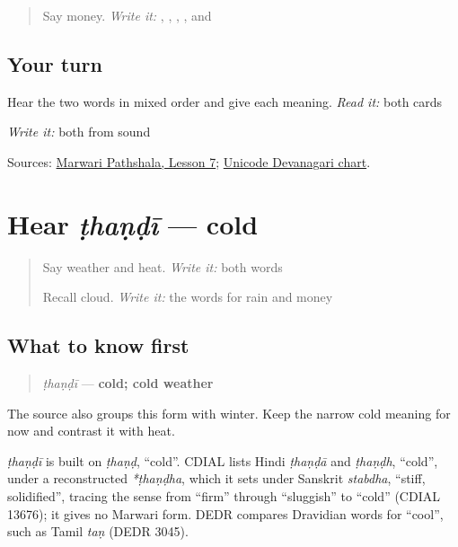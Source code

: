 \begin{quote}
Say money. \emph{Write it:} \textbf{}, \textbf{}, \textbf{}, \textbf{}, and \textbf{}
\end{quote}

\subsection*{Your turn}
Hear the two words in mixed order and give each meaning. \emph{Read it:} both cards

\emph{Write it:} both from sound

\begin{tcolorbox}[breakable,colback=teal!4,colframe=teal!35!black,title={Before you move on}]
Sources: \href{https://www.marwaripathshala.com/marwari-lesson-7-english}{Marwari Pathshala, Lesson 7}; \href{https://www.unicode.org/charts/PDF/U0900.pdf}{Unicode Devanagari chart}.
\end{tcolorbox}
\section[ṭhaṇḍī]{Hear \emph{ṭhaṇḍī} — cold}

\label{lesson:MW-C12-hear-thandi}



\begin{quote}
Say weather and heat. \emph{Write it:} both words

Recall cloud. \emph{Write it:} the words for rain and money
\end{quote}

\subsection*{What to know first}
\begin{quote}
\emph{ṭhaṇḍī} — \textbf{cold; cold weather}
\end{quote}

The source also groups this form with winter. Keep the narrow cold meaning for now and contrast it with heat.

\begin{cousinweb}
\emph{ṭhaṇḍī} is built on \emph{ṭhaṇḍ}, \textquotedblleft{}cold\textquotedblright{}. CDIAL lists Hindi \emph{ṭhaṇḍā} and \emph{ṭhaṇḍh}, \textquotedblleft{}cold\textquotedblright{}, under a reconstructed \emph{*ṭhaṇḍha}, which it sets under Sanskrit \emph{stabdha}, \textquotedblleft{}stiff, solidified\textquotedblright{}, tracing the sense from \textquotedblleft{}firm\textquotedblright{} through \textquotedblleft{}sluggish\textquotedblright{} to \textquotedblleft{}cold\textquotedblright{} (CDIAL 13676); it gives no Marwari form. DEDR compares Dravidian words for \textquotedblleft{}cool\textquotedblright{}, such as Tamil \emph{taṇ} (DEDR 3045).
\end{cousinweb}

